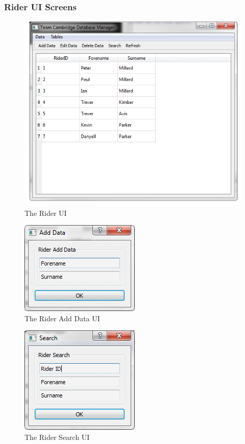 \subsubsection{Rider UI Screens}

\begin{figure}[H]
\includegraphics{./Maintenance/UI/Rider.png}
\caption{The Rider UI} \label{fig:Rider_UI}
\end{figure}

\begin{figure}[H]
\includegraphics{./Maintenance/UI/RiderAD.png}
\caption{The Rider Add Data UI} \label{fig:RiderAD_UI}
\end{figure}

\begin{figure}[H]
\includegraphics{./Maintenance/UI/RiderSearch.png}
\caption{The Rider Search UI} \label{fig:RdierSearch_UI}
\end{figure}


